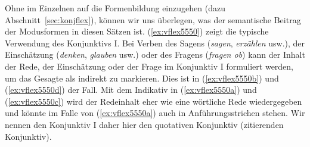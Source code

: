 \begin{exe}
  \ex \label{ex:vflex5550}
  \begin{xlist}
  \end{xlist}
  \ex \label{ex:vflex5548}
  \begin{xlist}
  \end{xlist}
  \ex \label{ex:vflex5549}
  \begin{xlist}
  \end{xlist}
  \ex \label{ex:vflex55491}
  \begin{xlist}
  \end{xlist}
\end{exe}

Ohne im Einzelnen auf die Formenbildung einzugehen (dazu Abschnitt~\ref{sec:konjflex}), können wir uns überlegen, was der semantische Beitrag der Modusformen in diesen Sätzen ist.
(\ref{ex:vflex5550}) zeigt die typische Verwendung des Konjunktivs I.
Bei Verben des Sagens (\textit{sagen}, \textit{erzählen} usw.), der Einschätzung (\textit{denken}, \textit{glauben} usw.) oder des Fragens (\textit{fragen ob}) kann der Inhalt der Rede, der Einschätzung oder der Frage im Konjunktiv I formuliert werden, um das Gesagte als indirekt zu markieren.
Dies ist in (\ref{ex:vflex5550b}) und (\ref{ex:vflex5550d}) der Fall.
Mit dem Indikativ in (\ref{ex:vflex5550a}) und (\ref{ex:vflex5550c}) wird der Redeinhalt eher wie eine wörtliche Rede wiedergegeben und könnte im Falle von (\ref{ex:vflex5550a}) auch in Anführungsstrichen stehen.
Wir nennen den Konjunktiv I daher hier den quotativen Konjunktiv (zitierenden Konjunktiv).

